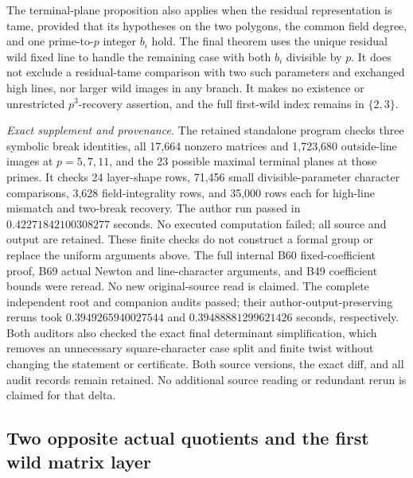 \begin{remark}
\label{rem:B-RD82-scope}
The terminal-plane proposition also applies when the residual
representation is tame, provided that its hypotheses on the
two polygons, the common field degree, and one prime-to-\(p\)
integer \(b_i\) hold. The final theorem uses the unique
residual wild fixed line to handle the remaining case with
both \(b_i\) divisible by \(p\). It does not exclude a
residual-tame comparison with two such parameters and
exchanged high lines, nor larger wild images in any branch.
It makes no existence or unrestricted \(p^3\)-recovery
assertion, and the full first-wild index remains in \(\{2,3\}\).

\smallskip
\noindent\emph{Exact supplement and provenance.}
The retained standalone program
checks three symbolic break identities, all 17,664 nonzero
matrices and 1,723,680 outside-line images at \(p=5,7,11\),
and the 23 possible maximal terminal planes at those primes.
It checks 24 layer-shape rows, 71,456 small divisible-parameter
character comparisons, 3,628 field-integrality rows, and
35,000 rows each for high-line mismatch and two-break recovery.
The author run passed in \(0.42271842100308277\) seconds.
No executed computation failed; all source and output are
retained. These finite checks do not construct a formal
group or replace the uniform arguments above. The full
internal B60 fixed-coefficient proof, B69 actual Newton
and line-character arguments, and B49 coefficient bounds
were reread. No new original-source read is claimed.
The complete independent root and companion audits passed;
their author-output-preserving reruns took
\(0.3949265940027544\) and \(0.39488881299621426\) seconds,
respectively. Both auditors also checked the exact final
determinant simplification, which removes an unnecessary
square-character case split and finite twist without changing
the statement or certificate. Both source versions, the exact
diff, and all audit records remain retained. No additional
source reading or redundant rerun is claimed for that delta.
\end{remark}


\subsection{Two opposite actual quotients and the first wild matrix layer}


